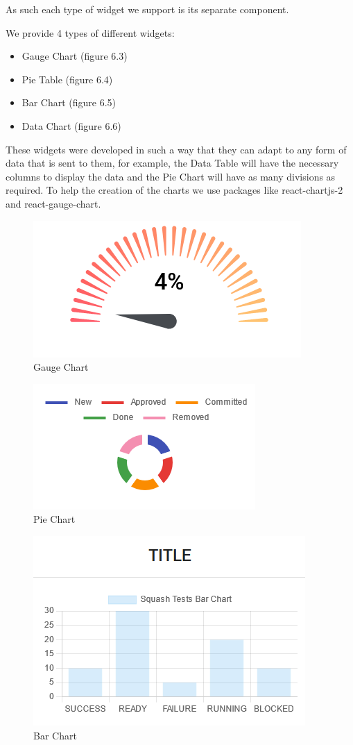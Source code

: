 \documentclass[a4paper,twoside,10pt]{report}
\begin{document}
As such each type of widget we support is its separate component. 

We provide 4 types of different widgets:
 \begin{itemize}
	\item Gauge Chart (figure 6.3)
	\item Pie Table (figure 6.4)
	\item Bar Chart (figure 6.5)
	\item Data Chart (figure 6.6)
\end{itemize}
These widgets were developed in such a way that they can adapt to any form of data that is sent to them, for example, the Data Table will have the necessary columns to display the data and the Pie Chart will have as many divisions as required. To help the creation of the charts we use packages like react-chartjs-2 and react-gauge-chart.

\begin{figure}[h!]
\center
  \includegraphics[]{gauge-chart.png}
\caption{Gauge Chart}
\end{figure}

\begin{figure}[h!]
\center
  \includegraphics[]{pie-chart.png}
\caption{Pie Chart}
\end{figure}

\newpage

\begin{figure}[h!]
\center
  \includegraphics[]{bar-chart.png}
\caption{Bar Chart}
\end{figure}
\end{document}
